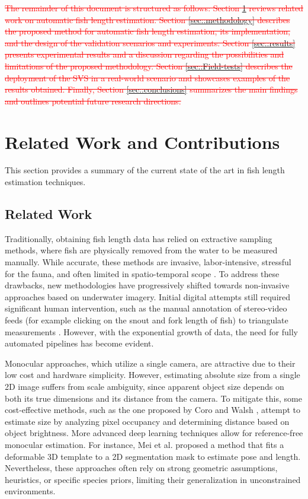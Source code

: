 \documentclass[utf8]{FrontiersinHarvard} %
\begin{document}
\textcolor{red}{ \st{The remainder of this document is structured as follows: Section \ref{sec::related} reviews related work on automatic fish length estimation. Section \ref{sec::methodology} describes the proposed method for automatic fish length estimation, its implementation, and the design of the validation scenarios and experiments. Section \ref{sec::results} presents experimental results and a discussion regarding the possibilities and limitations of the proposed methodology. Section \ref{sec::Field-tests} describes the deployment of the SVS in a real-world scenario and showcases examples of the results obtained. Finally, Section \ref{sec::conclusions} summarizes the main findings and outlines potential future research directions.} }



\section{Related Work and Contributions}\label{sec::related}

This section provides a summary of the current state of the art in fish length estimation techniques.


\subsection{Related Work}

Traditionally, obtaining fish length data has relied on extractive sampling methods, where fish are physically removed from the water to be measured manually. While accurate, these methods are invasive, labor-intensive, stressful for the fauna, and often limited in spatio-temporal scope \citep{Marrable2023}. To address these drawbacks, new methodologies have progressively shifted towards non-invasive approaches based on underwater imagery. Initial digital attempts still required significant human intervention, such as the manual annotation of stereo-video feeds (for example clicking on the snout and fork length of fish) to triangulate measurements \citep{Marrable2023}. However, with the exponential growth of data, the need for fully automated pipelines has become evident.

Monocular approaches, which utilize a single camera, are attractive due to their low cost and hardware simplicity. However, estimating absolute size from a single 2D image suffers from scale ambiguity, since apparent object size depends on both its true dimensions and its distance from the camera. To mitigate this, some cost-effective methods, such as the one proposed by Coro and Walsh \citep{Coro2021}, attempt to estimate size by analyzing pixel occupancy and determining distance based on object brightness. More advanced deep learning techniques allow for reference-free monocular estimation. For instance, Mei et al. \citep{Mei2021} proposed a method that fits a deformable 3D template to a 2D segmentation mask to estimate pose and length. Nevertheless, these approaches often rely on strong geometric assumptions, heuristics, or specific species priors, limiting their generalization in unconstrained environments.
\end{document}
